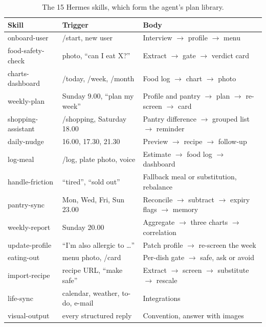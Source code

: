 \documentclass[11pt,a4paper]{article}
\begin{document}
\begin{table}[H]
\centering\small
\caption{The 15 Hermes skills, which form the agent's plan library.}
\label{tab:skills}
\begin{tabularx}{\textwidth}{@{}l l Y@{}}
\toprule
Skill & Trigger & Body \\
\midrule
onboard-user & /start, new user & Interview $\to$ profile $\to$ menu \\
food-safety-check & photo, ``can I eat X?'' & Extract $\to$ gate $\to$ verdict card \\
charts-dashboard & /today, /week, /month & Food log $\to$ chart $\to$ photo \\
weekly-plan & Sunday 9.00, ``plan my week'' & Profile and pantry $\to$ plan $\to$ re-screen $\to$ card \\
shopping-assistant & /shopping, Saturday 18.00 & Pantry difference $\to$ grouped list $\to$ reminder \\
daily-nudge & 16.00, 17.30, 21.30 & Preview $\to$ recipe $\to$ follow-up \\
log-meal & /log, plate photo, voice & Estimate $\to$ food log $\to$ dashboard \\
handle-friction & ``tired'', ``sold out'' & Fallback meal or substitution, rebalance \\
pantry-sync & Mon, Wed, Fri, Sun 23.00 & Reconcile $\to$ subtract $\to$ expiry flags $\to$ memory \\
weekly-report & Sunday 20.00 & Aggregate $\to$ three charts $\to$ correlation \\
update-profile & ``I'm also allergic to \ldots'' & Patch profile $\to$ re-screen the week \\
eating-out & menu photo, /card & Per-dish gate $\to$ safe, ask or avoid \\
import-recipe & recipe URL, ``make safe'' & Extract $\to$ screen $\to$ substitute $\to$ rescale \\
life-sync & calendar, weather, to-do, e-mail & Integrations \\
visual-output & every structured reply & Convention, answer with images \\
\bottomrule
\end{tabularx}
\end{table}
\end{document}
